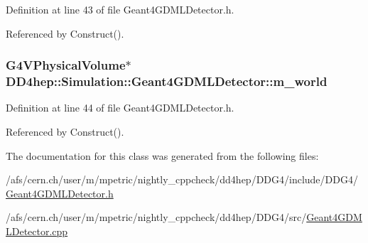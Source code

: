 Definition at line 43 of file Geant4GDMLDetector.h.

Referenced by Construct().\hypertarget{class_d_d4hep_1_1_simulation_1_1_geant4_g_d_m_l_detector_a26c0472c7321ec265414a1329ba5fdf3}{
\subsubsection[{m\_\-world}]{\setlength{\rightskip}{0pt plus 5cm}G4VPhysicalVolume$\ast$ {\bf DD4hep::Simulation::Geant4GDMLDetector::m\_\-world}}}
\label{class_d_d4hep_1_1_simulation_1_1_geant4_g_d_m_l_detector_a26c0472c7321ec265414a1329ba5fdf3}


Definition at line 44 of file Geant4GDMLDetector.h.

Referenced by Construct().

The documentation for this class was generated from the following files:\begin{DoxyCompactItemize}
\item 
/afs/cern.ch/user/m/mpetric/nightly\_\-cppcheck/dd4hep/DDG4/include/DDG4/\hyperlink{_geant4_g_d_m_l_detector_8h}{Geant4GDMLDetector.h}\item 
/afs/cern.ch/user/m/mpetric/nightly\_\-cppcheck/dd4hep/DDG4/src/\hyperlink{_geant4_g_d_m_l_detector_8cpp}{Geant4GDMLDetector.cpp}\end{DoxyCompactItemize}
